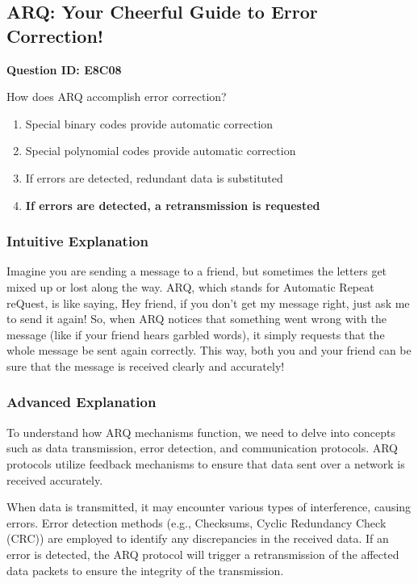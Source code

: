 \subsection{ARQ: Your Cheerful Guide to Error Correction!}

\begin{tcolorbox}
\textbf{Question ID: E8C08} 

How does ARQ accomplish error correction?
\begin{enumerate}[label=\Alph*.]
    \item Special binary codes provide automatic correction
    \item Special polynomial codes provide automatic correction
    \item If errors are detected, redundant data is substituted
    \item \textbf{If errors are detected, a retransmission is requested}
\end{enumerate}
\end{tcolorbox}

\subsubsection{Intuitive Explanation}
Imagine you are sending a message to a friend, but sometimes the letters get mixed up or lost along the way. ARQ, which stands for Automatic Repeat reQuest, is like saying, Hey friend, if you don't get my message right, just ask me to send it again! So, when ARQ notices that something went wrong with the message (like if your friend hears garbled words), it simply requests that the whole message be sent again correctly. This way, both you and your friend can be sure that the message is received clearly and accurately!

\subsubsection{Advanced Explanation}
To understand how ARQ mechanisms function, we need to delve into concepts such as data transmission, error detection, and communication protocols. ARQ protocols utilize feedback mechanisms to ensure that data sent over a network is received accurately. 

When data is transmitted, it may encounter various types of interference, causing errors. Error detection methods (e.g., Checksums, Cyclic Redundancy Check (CRC)) are employed to identify any discrepancies in the received data. If an error is detected, the ARQ protocol will trigger a retransmission of the affected data packets to ensure the integrity of the transmission.

